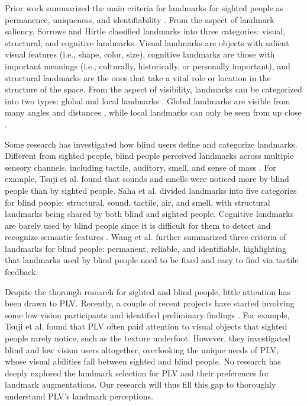 Prior work summarized the main criteria for landmarks for sighted people as permanence, uniqueness, and identifiability \cite{yesiltepe2021landmarks}. From the aspect of landmark saliency, Sorrows and Hirtle \cite{sorrows1999nature} classified landmarks into three categories: visual, structural, and cognitive landmarks. Visual landmarks are objects with salient visual features (i.e., shape, color,  size), cognitive landmarks are those with important meanings (i.e., culturally, historically, or personally important), and structural landmarks are the ones that take a vital role or location in the structure of the space. From the aspect of visibility, landmarks can be categorized into two types: global and local landmarks \cite{steck2000role,lynch1964image,yesiltepe2021landmarks}. 
Global landmarks are visible from many angles and distances \cite{lynch1964image}, while local landmarks can only be seen from up close \cite{steck2000role}.



Some research has investigated how blind users define and categorize landmarks. Different from sighted people, blind people perceived landmarks across multiple sensory channels, including tactile, auditory, smell, and sense of mass \cite{jeamwatthanachai2019indoor, wang2023understanding, tsuji12005landmarks}. For example, Tsuji et al. \cite{tsuji12005landmarks} found that sounds and smells were noticed more by blind people than by sighted people. 
Saha et al. \cite{saha2019closing} divided landmarks into five categories for blind people: structural, sound, tactile, air, and smell, with structural landmarks being shared by both blind and sighted people. Cognitive landmarks are barely used by blind people since it is difficult for them to detect and recognize semantic features \cite{sato2019navcog3}. Wang et al. \cite{wang2023understanding} further summarized three criteria of landmarks for blind people: permanent, reliable, and identifiable, highlighting that landmarks used by blind people need to be fixed and easy to find via tactile feedback. %


Despite the thorough research for sighted and blind people, little attention has been drawn to PLV. Recently, a couple of recent projects have started involving some low vision participants and identified preliminary findings \cite{wang2023understanding,tsuji12005landmarks}. For example, Tsuji et al. \cite{tsuji12005landmarks} found that PLV often paid attention to visual objects that sighted people rarely notice, such as the texture underfoot. However, they investigated blind and low vision users altogether, overlooking the unique needs of PLV, whose visual abilities fall between sighted and blind people. No research has deeply explored the landmark selection for PLV and their preferences for landmark augmentations. Our research will thus fill this gap to thoroughly understand PLV's landmark perceptions. 



